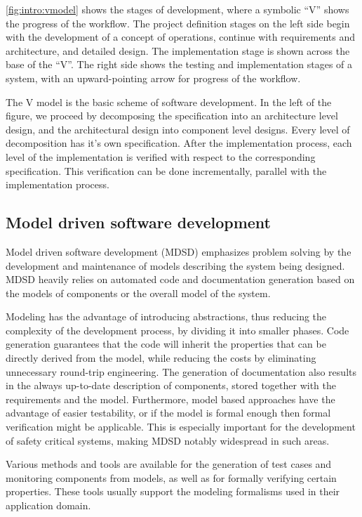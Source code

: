 \cref{fig:intro:vmodel} shows the stages of development, where a symbolic ``V'' shows the progress of the workflow. The project definition stages on the left side begin with the development of a concept of operations, continue with requirements and architecture, and detailed design. The implementation stage is shown across the base of the ``V''. The right side shows the testing and implementation stages of a system, with an upward-pointing arrow for progress of the workflow\citep{vmodel}. 

The V model is the basic scheme of software development. In the left of the figure, we proceed by decomposing the specification into an architecture level design, and the architectural design into component level designs. Every level of decomposition has it's own specification. After the implementation process, each level of the implementation is verified with respect to the corresponding specification. This verification can be done incrementally, parallel  with the implementation process.

\subsection{Model driven software development}

Model driven software development (MDSD) emphasizes problem solving by the development and maintenance of models describing the system being designed. MDSD heavily relies on automated code and documentation generation based on the models of components or the overall model of the system. 

Modeling has the advantage of introducing abstractions, thus reducing the complexity of the development process, by dividing it into smaller phases. Code generation guarantees that the code will inherit the properties that can be directly derived from the model, while reducing the costs by eliminating unnecessary round-trip engineering. The generation of documentation also results in the always up-to-date description of components, stored together with the requirements and the model. Furthermore, model based approaches have the advantage of easier testability, or if the model is formal enough then formal verification might be applicable. This is especially important for the development of safety critical systems, making MDSD notably widespread in such areas.

Various methods and tools are available for the generation of test cases and monitoring components from models, as well as for formally verifying certain properties. These tools usually support the modeling formalisms used in their application domain.

